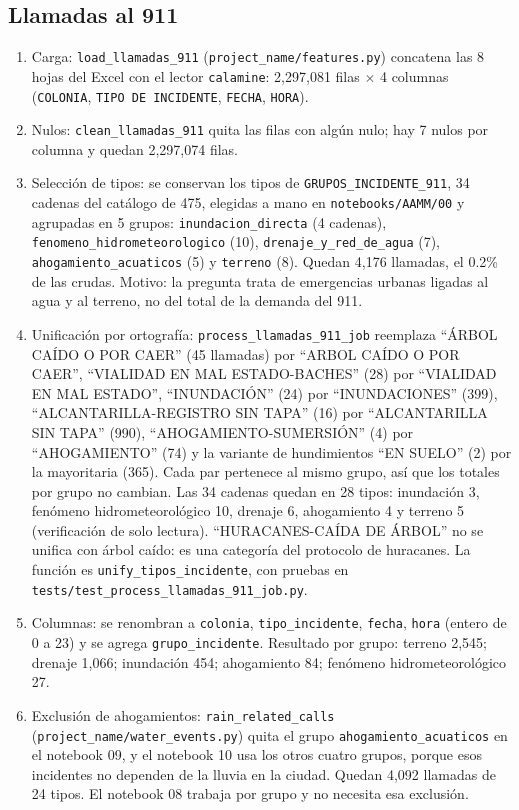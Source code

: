 \documentclass[11pt]{article}
\newcommand{\cod}[1]{\nolinkurl{#1}}
\begin{document}
\subsection{Llamadas al 911}

\begin{enumerate}
  \item Carga: \cod{load_llamadas_911} (\cod{project_name/features.py}) concatena las 8 hojas del Excel con el lector \cod{calamine}: 2,297,081 filas $\times$ 4 columnas (\cod{COLONIA}, \texttt{TIPO DE INCIDENTE}, \cod{FECHA}, \cod{HORA}).
  \item Nulos: \cod{clean_llamadas_911} quita las filas con algún nulo; hay 7 nulos por columna y quedan 2,297,074 filas.
  \item Selección de tipos: se conservan los tipos de \cod{GRUPOS_INCIDENTE_911}, 34 cadenas del catálogo de 475, elegidas a mano en \cod{notebooks/AAMM/00} y agrupadas en 5 grupos: \cod{inundacion_directa} (4 cadenas), \cod{fenomeno_hidrometeorologico} (10), \cod{drenaje_y_red_de_agua} (7), \cod{ahogamiento_acuaticos} (5) y \cod{terreno} (8). Quedan 4,176 llamadas, el 0.2\% de las crudas. Motivo: la pregunta trata de emergencias urbanas ligadas al agua y al terreno, no del total de la demanda del 911.
  \item Unificación por ortografía: \cod{process_llamadas_911_job} reemplaza ``ÁRBOL CAÍDO O POR CAER'' (45 llamadas) por ``ARBOL CAÍDO O POR CAER'', ``VIALIDAD EN MAL ESTADO-BACHES'' (28) por ``VIALIDAD EN MAL ESTADO'', ``INUNDACIÓN'' (24) por ``INUNDACIONES'' (399), ``ALCANTARILLA-REGISTRO SIN TAPA'' (16) por ``ALCANTARILLA SIN TAPA'' (990), ``AHOGAMIENTO-SUMERSIÓN'' (4) por ``AHOGAMIENTO'' (74) y la variante de hundimientos ``EN SUELO'' (2) por la mayoritaria (365). Cada par pertenece al mismo grupo, así que los totales por grupo no cambian. Las 34 cadenas quedan en 28 tipos: inundación 3, fenómeno hidrometeorológico 10, drenaje 6, ahogamiento 4 y terreno 5 (verificación de solo lectura). ``HURACANES-CAÍDA DE ÁRBOL'' no se unifica con árbol caído: es una categoría del protocolo de huracanes. La función es \cod{unify_tipos_incidente}, con pruebas en \cod{tests/test_process_llamadas_911_job.py}.
  \item Columnas: se renombran a \cod{colonia}, \cod{tipo_incidente}, \cod{fecha}, \cod{hora} (entero de 0 a 23) y se agrega \cod{grupo_incidente}. Resultado por grupo: terreno 2,545; drenaje 1,066; inundación 454; ahogamiento 84; fenómeno hidrometeorológico 27.
  \item Exclusión de ahogamientos: \cod{rain_related_calls} (\cod{project_name/water_events.py}) quita el grupo \cod{ahogamiento_acuaticos} en el notebook 09, y el notebook 10 usa los otros cuatro grupos, porque esos incidentes no dependen de la lluvia en la ciudad. Quedan 4,092 llamadas de 24 tipos. El notebook 08 trabaja por grupo y no necesita esa exclusión.
\end{enumerate}
\end{document}

